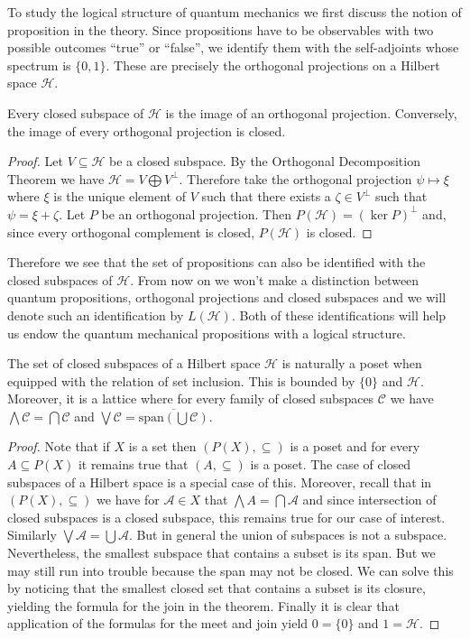 To study the logical structure of quantum mechanics we first discuss the notion of proposition in the theory. Since propositions have to be observables with two possible outcomes ``true'' or ``false'', we identify them with the self-adjoints whose spectrum is $\{0,1\}$. These are precisely the orthogonal projections on a Hilbert space $\mathcal{H}$.

\begin{theorem}
Every closed subspace of $\mathcal{H}$ is the image of an orthogonal projection. Conversely, the image of every orthogonal projection is closed.
\end{theorem}
\begin{proof}
Let $V\subseteq\mathcal{H}$ be a closed subspace.  By the Orthogonal Decomposition Theorem we have $\mathcal{H}=V\bigoplus V^{\bot}$\cite{Hewitt1975}. Therefore take the orthogonal projection $\psi\mapsto\xi$ where $\xi$ is the unique element of $V$ such that there exists a $\zeta\in V^{\bot}$ such that $\psi=\xi+\zeta$.
Let $P$ be an orthogonal projection. Then $P(\mathcal{H})=(\ker P)^{\bot}$ and, since every orthogonal complement is closed, $P(\mathcal{H})$ is closed.
\end{proof}

Therefore we see that the set of propositions can also be identified with the closed subspaces of $\mathcal{H}$. From now on we won't make a distinction between quantum propositions, orthogonal projections and closed subspaces and we will denote such an identification by $L(\mathcal{H})$. Both of these identifications will help us endow the quantum mechanical propositions with a logical structure.

\begin{theorem}\label{thm:quantum_complements}
The set of closed subspaces of a Hilbert space $\mathcal{H}$ is naturally a poset when equipped with the relation of set inclusion. This is bounded by $\{0\}$ and $\mathcal{H}$. Moreover, it is a lattice where for every family of closed subspaces $\mathcal{C}$ we have $\bigwedge \mathcal{C} = \bigcap \mathcal{C}$ and $\bigvee \mathcal{C} = \overline{\text{span}\left(\bigcup\mathcal{C}\right)}$.
\end{theorem}

\begin{proof}
Note that if $X$ is a set then $(P(X),\subseteq)$ is a poset and for every $A\subseteq P(X)$ it remains true that $(A,\subseteq)$ is a poset. The case of closed subspaces of a Hilbert space is a special case of this. Moreover, recall that in $(P(X),\subseteq)$ we have for $\mathcal{A}\in X$ that $\bigwedge A = \bigcap \mathcal{A}$ and since intersection of closed subspaces is a closed subspace, this remains true for our case of interest. Similarly $\bigvee\mathcal{A}=\bigcup\mathcal{A}$. But in general the union of subspaces is not a subspace. Nevertheless, the smallest subspace that contains a subset is its span. But we may still run into trouble because the span may not be closed. We can solve this by noticing that the smallest closed set that contains a subset is its closure, yielding the formula for the join in the theorem. Finally it is clear that application of the formulas for the meet and join yield $0=\{0\}$ and $1=\mathcal{H}$. 
\end{proof}

